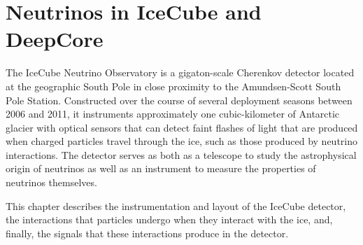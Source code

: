\setchapterpreamble[u]{\margintoc}
\chapter{Neutrinos in IceCube and DeepCore}

The IceCube Neutrino Observatory is a gigaton-scale Cherenkov detector located at the geographic South Pole in close proximity to the Amundsen-Scott South Pole Station. Constructed over the course of several deployment seasons between 2006 and 2011, it instruments approximately one cubic-kilometer of Antarctic glacier with optical sensors that can detect faint flashes of light that are produced when charged particles travel through the ice, such as those produced by neutrino interactions. The detector serves as both as a telescope to study the astrophysical origin of neutrinos as well as an instrument to measure the properties of neutrinos themselves.

This chapter describes the instrumentation and layout of the IceCube detector, the interactions that particles undergo when they interact with the ice, and, finally, the signals that these interactions produce in the detector.







